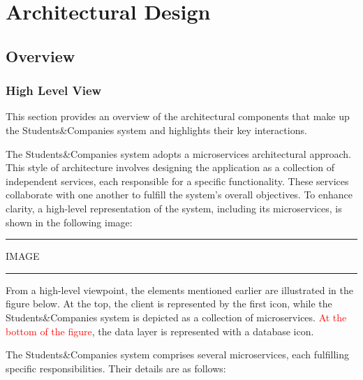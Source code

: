 \chapter{Architectural Design}

\section{Overview}

\subsection{High Level View}

This section provides an overview of the architectural components that make up the Students\&Companies system and highlights their key interactions.

The Students\&Companies system adopts a microservices architectural approach. This style of architecture involves designing the application as a collection of independent services, each responsible for a specific functionality. These services collaborate with one another to fulfill the system's overall objectives. To enhance clarity, a high-level representation of the system, including its microservices, is shown in the following image:

\vspace{20pt}
\hrule
\vspace{10pt}
IMAGE
\vspace{10pt}
\hrule
\vspace{20pt}

From a high-level viewpoint, the elements mentioned earlier are illustrated in the figure below. At the top, the client is represented by the first icon, while the Students\&Companies system is depicted as a collection of microservices. \textcolor{red}{At the bottom of the figure}, the data layer is represented with a database icon.

The Students\&Companies system comprises several microservices, each fulfilling specific responsibilities. Their details are as follows:

